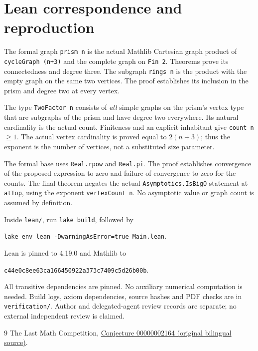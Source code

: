 \documentclass[11pt]{article}
\begin{document}
\section*{Lean correspondence and reproduction}
The formal graph \texttt{prism n} is the actual Mathlib Cartesian graph product of \texttt{cycleGraph (n+3)} and the complete graph on \texttt{Fin 2}. Theorems prove its connectedness and degree three. The subgraph \texttt{rings n} is the product with the empty graph on the same two vertices. The proof establishes its inclusion in the prism and degree two at every vertex.

The type \texttt{TwoFactor n} consists of \emph{all} simple graphs on the prism's vertex type that are subgraphs of the prism and have degree two everywhere. Its natural cardinality is the actual count. Finiteness and an explicit inhabitant give \texttt{count n} $\ge1$. The actual vertex cardinality is proved equal to $2(n+3)$; thus the exponent is the number of vertices, not a substituted size parameter.

The formal base uses \texttt{Real.rpow} and \texttt{Real.pi}. The proof establishes convergence of the proposed expression to zero and failure of convergence to zero for the counts. The final theorem negates the actual \texttt{Asymptotics.IsBigO} statement at \texttt{atTop}, using the exponent \texttt{vertexCount n}. No asymptotic value or graph count is assumed by definition.

Inside \texttt{lean/}, run \texttt{lake build}, followed by
\begin{center}\texttt{lake env lean -DwarningAsError=true Main.lean}.\end{center}
Lean is pinned to 4.19.0 and Mathlib to
\begin{center}\small\texttt{c44e0c8ee63ca166450922a373c7409c5d26b00b}.\end{center}
All transitive dependencies are pinned. No auxiliary numerical computation is needed. Build logs, axiom dependencies, source hashes and PDF checks are in \texttt{verification/}. Author and delegated-agent review records are separate; no external independent review is claimed.

\begin{thebibliography}{9}
 The Last Math Competition,
\href{https://github.com/The-Last-Math-Competition/The-Last-Math-Competition/blob/main/conjectures/00000002164.md}{Conjecture 00000002164 (original bilingual source)}.
\end{thebibliography}
\end{document}
